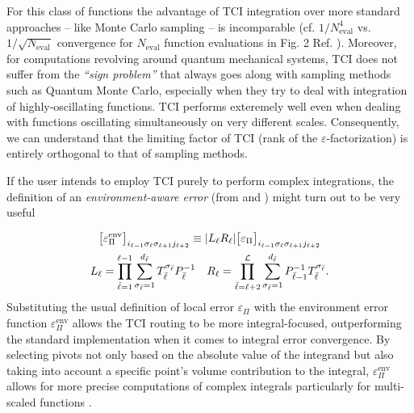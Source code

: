 For this class of functions the advantage of TCI integration over more standard approaches -- like Monte Carlo sampling -- is incomparable (cf. $1/N_{\text{eval}}^4$ vs. $1/\sqrt{N_{\text{eval}}}$ convergence for $N_{\text{eval}}$ function evaluations in Fig. 2 Ref. \cite{Fernandez2024}). Moreover, for computations revolving around quantum mechanical systems, TCI does not suffer from the \textit{``sign problem''} that always goes along with sampling methods such as Quantum Monte Carlo, especially when they try to deal with integration of highly-oscillating functions. TCI performs exteremely well even when dealing with functions oscillating simultaneously on very different scales. Consequently, we can understand that the limiting factor of TCI (rank of the $\varepsilon$-factorization) is entirely orthogonal
to that of sampling methods.

If the user intends to employ TCI purely to perform complex integrations, the definition of an \textit{environment-aware error} (from  and ) might turn out to be very useful

\begin{gather}
	\nonumber\bigl[\varepsilon^{\text{env}}_\Pi\bigr]_{i_{\ell-1}\sigma_\ell \sigma_{\ell +1} j_{\ell +2 }}\equiv |L_\ell R_\ell| \bigl[\varepsilon_\Pi\bigr]_{i_{\ell-1}\sigma_\ell \sigma_{\ell +1} j_{\ell +2 }} \\
	L_\ell = \prod_{\bar{\ell}=1}^{\ell -1} \sum^{d_{\bar{\ell}}}_{\sigma_{\bar{\ell}} = 1} T^{\sigma_{\bar{\ell}}}_{\bar{\ell}} P^{-1}_{\bar{\ell}} \quad R_\ell = \prod_{\bar{\ell}=\ell +2}^{\mathcal{L}} \sum^{d_{\bar{\ell}}}_{\sigma_{\bar{\ell}} = 1}  P^{-1}_{\bar{\ell}-1}T^{\sigma_{\bar{\ell}}}_{\bar{\ell}}.
	\label{eq:envError}
\end{gather}
Substituting the usual definition of local  error $\varepsilon_\Pi$ with the environment error function $\varepsilon^{\text{env}}_\Pi$ allows the TCI routing to be more integral-focused, outperforming the standard implementation when it comes to integral error convergence. By selecting pivots not only based on the absolute value of the integrand but also taking into account a specific point's volume contribution to the integral,  $\varepsilon^{\text{env}}_\Pi$ allows for more precise computations of complex integrals particularly for multi-scaled functions \cite{Fernandez2022}.   


\\

